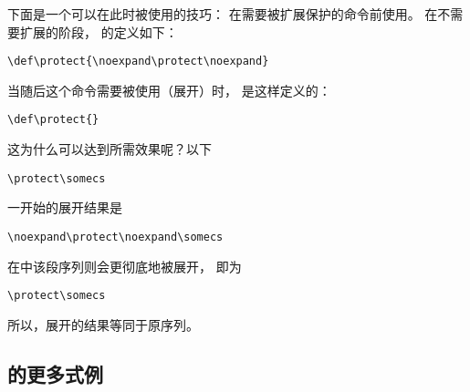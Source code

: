 \documentclass{book}
\begin{document}
下面是一个可以在此时被使用的技巧：
在需要被扩展保护的命令前使用。
在不需要扩展的阶段，
的定义如下：
\begin{verbatim}
\def\protect{\noexpand\protect\noexpand}
\end{verbatim}
当随后这个命令需要被使用（展开）时，
是这样定义的：
\begin{verbatim}
\def\protect{}
\end{verbatim}

这为什么可以达到所需效果呢？以下
\begin{verbatim}
\protect\somecs
\end{verbatim}
一开始的展开结果是
\begin{verbatim}
\noexpand\protect\noexpand\somecs
\end{verbatim}
在中该段序列则会更彻底地被展开，
即为
\begin{verbatim}
\protect\somecs
\end{verbatim}
所以，展开的结果等同于原序列。


\subsection{的更多式例}
\end{document}
